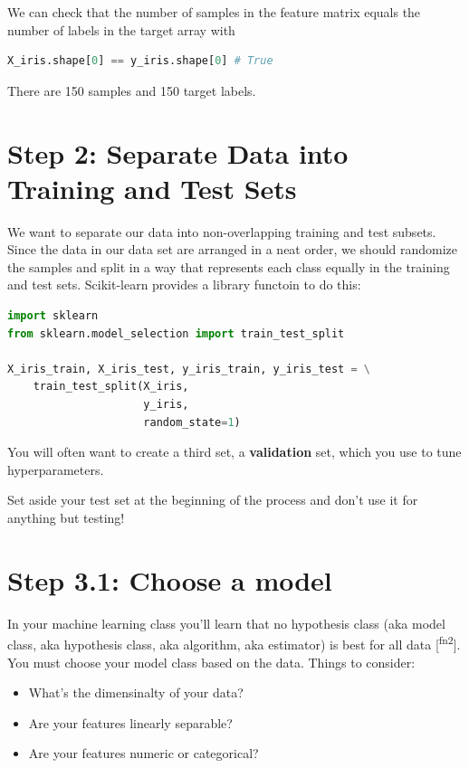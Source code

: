 \documentclass[11pt]{article}
\renewenvironment{quote}{\begin{shaded*}\begin{oldquote}}{\end{oldquote}\end{shaded*}}
\begin{document}
We can check that the number of samples in the feature matrix equals the number of labels in the target array with

\begin{lstlisting}[language=Python,numbers=none]
X_iris.shape[0] == y_iris.shape[0] # True
\end{lstlisting}

There are 150 samples and 150 target labels.
\section{Step 2: Separate Data into Training and Test Sets}
\label{sec:org8672eb8}

We want to separate our data into non-overlapping training and test subsets. Since the data in our data set are arranged in a neat order, we should randomize the samples and split in a way that represents each class equally in the training and test sets. Scikit-learn provides a library functoin to do this:

\begin{lstlisting}[language=Python,numbers=none]
import sklearn
from sklearn.model_selection import train_test_split

X_iris_train, X_iris_test, y_iris_train, y_iris_test = \
    train_test_split(X_iris,
                     y_iris,
                     random_state=1)
\end{lstlisting}

You will often want to create a third set, a \textbf{validation} set, which you use to tune hyperparameters.

\begin{quote}
Set aside your test set at the beginning of the process and don't use it for anything but testing!
\end{quote}
\section{Step 3.1: Choose a model}
\label{sec:org4700624}

In your machine learning class you'll learn that no hypothesis class (aka model class, aka hypothesis class, aka algorithm, aka estimator) is best for all data [\textsuperscript{fn2}]. You must choose your model class based on the data. Things to consider:

\begin{itemize}
\item What's the dimensinalty of your data?
\item Are your features linearly separable?
\item Are your features numeric or categorical?
\end{itemize}
\end{document}
